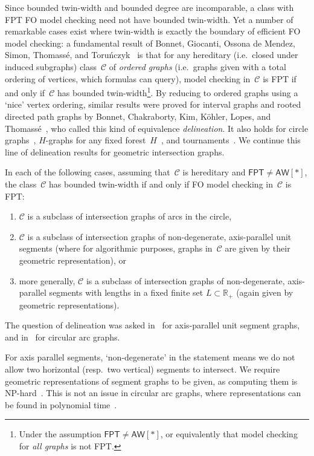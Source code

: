 \documentclass[a4paper,UKenglish,cleveref,thm-restate]{lipics-v2021}
\theoremstyle{remark}
\newcommand{\Cc}{\mathcal{C}}
\newcommand{\R}{\mathbb{R}}
\newcommand{\fpt}{\ensuremath{\mathsf{FPT}}\xspace}
\newcommand{\aw}{\ensuremath{\mathsf{AW}[*]}\xspace}
\begin{document}
Since bounded twin-width and bounded degree are incomparable, a class with FPT FO model checking need not have bounded twin-width.
Yet a number of remarkable cases exist where twin-width is exactly the boundary of efficient FO model checking:
a fundamental result of Bonnet, Giocanti, Ossona de Mendez, Simon, Thomassé, and Toruńczyk~\cite{twin-width4} is that
for any hereditary (i.e.\ closed under induced subgraphs) class~$\Cc$ of \emph{ordered graphs} (i.e.\ graphs given with a total ordering of vertices, which formulas can query), model checking in~$\Cc$ is FPT if and only if~$\Cc$ has bounded twin-width\footnote{Under the assumption $\fpt \neq \aw$, or equivalently that model checking for \emph{all graphs} is not FPT.}.
By reducing to ordered graphs using a `nice' vertex ordering, similar results were proved for interval graphs and rooted directed path graphs by Bonnet, Chakraborty, Kim, Köhler, Lopes, and Thomassé~\cite{bonnet2022delineation}, who called this kind of equivalence \emph{delineation}.
It also holds for circle graphs~\cite{hlineny2022geometric}, $H$-graphs for any fixed forest~$H$~\cite{bonomo2025noncrossinghgraphs}, and tournaments~\cite{geniet2023tournaments}.
We continue this line of delineation results for geometric intersection graphs.
\begin{theorem}\label{thm:main}
    In each of the following cases, assuming that~$\Cc$ is hereditary and $\fpt \neq \aw$, the class~$\Cc$ has bounded twin-width if and only if FO model checking in~$\Cc$ is FPT:
    \begin{enumerate}
        \item $\Cc$ is a subclass of intersection graphs of arcs in the circle,
        \item $\Cc$ is a subclass of intersection graphs of non-degenerate, axis-parallel unit segments
        (where for algorithmic purposes, graphs in~$\Cc$ are given by their geometric representation), or
        \item more generally, $\Cc$ is a subclass of intersection graphs of non-degenerate, axis-parallel segments with lengths in a fixed finite set $L \subset \R_+$ (again given by geometric representations).
    \end{enumerate}
\end{theorem}
The question of delineation was asked in~\cite{bonnet2022delineation} for axis-parallel unit segment graphs, and in~\cite{bonomo2025noncrossinghgraphs} for circular arc graphs.

For axis parallel segments, `non-degenerate' in the statement means we do not allow two horizontal (resp.\ two vertical) segments to intersect.
We require geometric representations of segment graphs to be given, as computing them is NP-hard~\cite{mustata2013unitgrid}.
This is not an issue in circular arc graphs, where representations can be found in polynomial time~\cite{tucker1980circular}.
\end{document}
